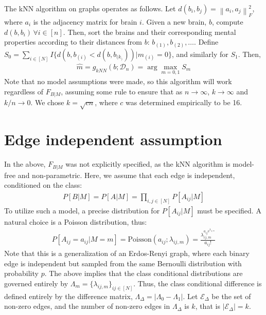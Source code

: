 \documentclass{article}
\newcommand{\mD}{\mathcal{D}}
\newcommand{\mE}{\mathcal{E}}
\newcommand{\hm}{\widehat{m}}
\newcommand{\lam}{\lambda}
\newcommand{\Lam}{\Lambda}
\newcommand{\conv}{\rightarrow}
\providecommand{\norm}[1]{\left \lVert#1 \right  \rVert}
\newcommand{\mED}{\mE_{\Delta}}
\begin{document}
The kNN algorithm on graphs operates as follows.  Let $d(b_i,b_j)=\norm{a_i,a_j}_F^2$, where $a_i$ is the adjacency matrix for brain $i$.  Given a new brain, $b$, compute $d(b,b_i)\, \forall i \in [n]$.  Then, sort the brains and their corresponding mental properties according to their distances from $b$: $b_{(1)}, b_{(2)}, \ldots$.  Define $S_0=\sum_{i \in [N]} I\{d(b,b_{(i)} < d(b,b_{(k_)})) | m_{(i)}=0\}$, and similarly for $S_1$. Then, 
\begin{align}
\hm=g_{kNN}(b; \mD_n) = \arg \max_{m=0,1} S_m	
\end{align}
Note that no model assumptions were made, so this algorithm will work regardless of $F_{B|M}$, assuming some rule to ensure that as $n\conv \infty$, $k \conv \infty$ and $k/n \conv 0$.  We chose $k=\sqrt{c n}$, where $c$ was determined empirically to be 16.  



\section{Edge independent assumption} %
\label{sub:edge_indep}

In the above, $F_{B|M}$ was not explicitly specified, as the kNN algorithm is model-free and non-parametric.  Here, we assume that each edge is independent, conditioned on the class:
\begin{align}
	P[B|M]=P[A|M]=\prod_{i,j \in [N]} P[A_{ij} | M]
\end{align}
To utilize such a model, a precise distribution for $P[A_{ij}|M]$ must be specified.  A natural choice is a Poisson distribution, thus:
\begin{align}
	P[A_{ij}=a_{ij} |M=m]=\text{Poisson}(a_{ij}; \lam_{ij,m}) = \frac{\lam_{ij,m}^{a_{ij} \text{e}^{\lam_{ij,m}}}}{a_{ij}!}
\end{align}
Note that this is a generalization of an Erdos-Renyi graph, where each binary edge is independent but sampled from the same Bernoulli distribution with probability $p$.  The above implies that the class conditional distributions are governed entirely by $\Lam_m=\{\lam_{ij,m}\}_{ij \in [N]}$.  Thus, the class conditional difference is defined entirely by the difference matrix, $\Lam_{\Delta} = |\Lam_0 - \Lam_1|$. Let $\mED$ be the set of non-zero edges, and the number of non-zero edges in $\Lam_{\Delta}$ is $k$, that is $|\mED|=k$.
\end{document}
